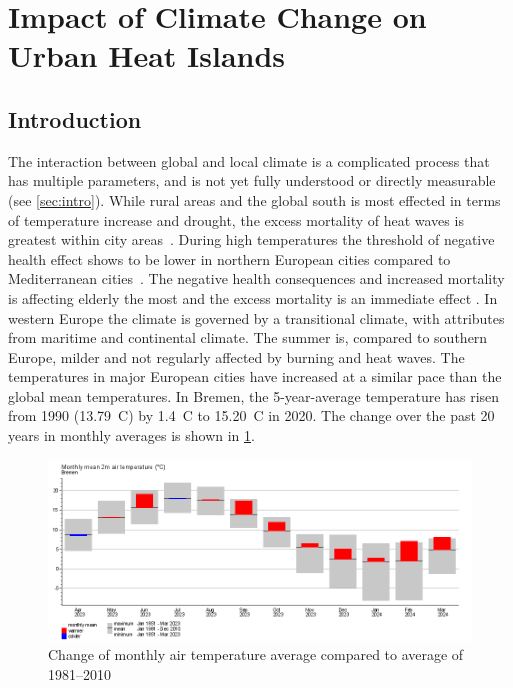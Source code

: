 \documentclass[12pt,a4paper, english,twoside]{scrartcl}
\begin{document}
  \newpage
  \section{Impact of Climate Change on Urban Heat Islands}\label{sec:UHITempImp}
    \subsection{Introduction}
      The interaction between global and local climate is a complicated process that has multiple parameters, and is not yet fully understood or directly measurable (see \cref{sec:intro}).  
      While rural areas and the global south is most effected in terms of temperature increase and drought, the excess mortality of heat waves is greatest within city areas~\autocite{Gabriel2011}. During high temperatures the threshold of negative health effect shows to be lower in northern European cities compared to Mediterranean cities~\autocite{Baccini2008}. 
      The negative health consequences and increased mortality is affecting elderly the most and the excess mortality is an immediate effect \autocite{Baccini2008}. 
      In western Europe the climate is governed by a transitional climate, with attributes from maritime and continental climate.
      The summer is, compared to southern Europe, milder and not regularly affected by burning and heat waves. 
      The temperatures in major European cities have increased at a similar pace than the global mean temperatures. 
      In Bremen, the 5-year-average temperature has risen from 1990 (13.79\textdegree\ C)  by 1.4\textdegree\ C to 15.20\textdegree\ C in 2020.
      The change over the past 20 years in monthly averages is shown in \cref{fig:monthAvg}.
      \begin{figure}[!htbp]
          \centering
          \includegraphics[width=\textwidth]{img/BremenClimateAvgDiff2023.png}
          \caption{Change of monthly air temperature average compared to average of 1981--2010~\autocite{DWD2024a}\label{fig:monthAvg}}
      \end{figure}
\end{document}

